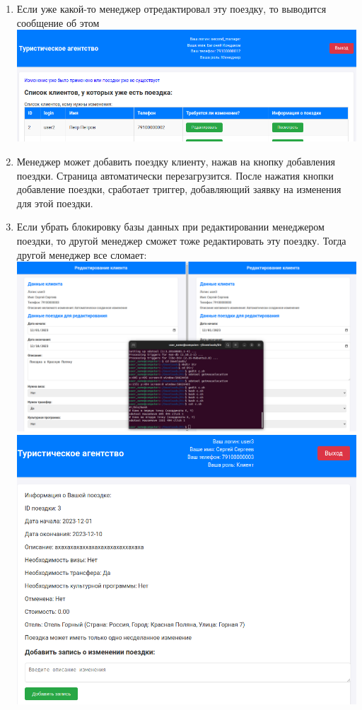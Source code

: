 \documentclass[a4paper,12pt]{article}
\begin{document}
\begin{enumerate}
    \item Если уже какой-то менеджер отредактировал эту поездку, то выводится сообщение об этом \\
          \includegraphics[scale=0.5]{media/manager/done.png} \\
    \item Менеджер может добавить поездку клиенту, нажав на кнопку добавления поездки. Страница автоматически перезагрузится.
          После нажатия кнопки добавление поездки, сработает триггер, добавляющий заявку на изменения для этой поездки.
    \item Если убрать блокировку базы данных при редактировании менеджером поездки, то другой менеджер сможет тоже редактировать эту поездку.
          Тогда другой менеджер все сломает: \\
          \includegraphics[scale=0.2]{media/manager/brake1.png} \\
          \includegraphics[scale=0.5]{media/manager/brake2.png} \\
\end{enumerate}
\end{document}
